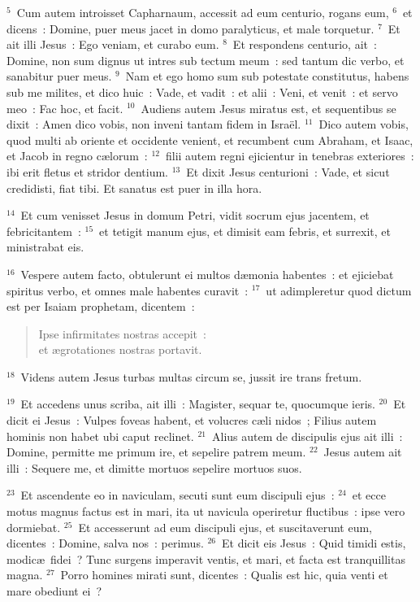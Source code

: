 ${}^{5}$~Cum autem introisset Capharnaum, accessit ad eum centurio, rogans eum,
${}^{6}$~et dicens~: Domine, puer meus jacet in domo paralyticus, et male torquetur.
${}^{7}$~Et ait illi Jesus~: Ego veniam, et curabo eum.
${}^{8}$~Et respondens centurio, ait~: Domine, non sum dignus ut intres sub tectum meum~: sed tantum dic verbo, et sanabitur puer meus.
${}^{9}$~Nam et ego homo sum sub potestate constitutus, habens sub me milites, et dico huic~: Vade, et vadit~: et alii~: Veni, et venit~: et servo meo~: Fac hoc, et facit.
${}^{10}$~Audiens autem Jesus miratus est, et sequentibus se dixit~: Amen dico vobis, non inveni tantam fidem in Isra\"el.
${}^{11}$~Dico autem vobis, quod multi ab oriente et occidente venient, et recumbent cum Abraham, et Isaac, et Jacob in regno c\ae lorum~:
${}^{12}$~filii autem regni ejicientur in tenebras exteriores~: ibi erit fletus et stridor dentium.
${}^{13}$~Et dixit Jesus centurioni~: Vade, et sicut credidisti, fiat tibi. Et sanatus est puer in illa hora.


${}^{14}$~Et cum venisset Jesus in domum Petri, vidit socrum ejus jacentem, et febricitantem~:
${}^{15}$~et tetigit manum ejus, et dimisit eam febris, et surrexit, et ministrabat eis.


${}^{16}$~Vespere autem facto, obtulerunt ei multos d\ae monia habentes~: et ejiciebat spiritus verbo, et omnes male habentes curavit~:
${}^{17}$~ut adimpleretur quod dictum est per Isaiam prophetam, dicentem~: \begin{flushleft}\begin{verse}Ipse infirmitates nostras accepit~:\\ et \ae grotationes nostras portavit.\end{verse}\end{flushleft}


${}^{18}$~Videns autem Jesus turbas multas circum se, jussit ire trans fretum.


${}^{19}$~Et accedens unus scriba, ait illi~: Magister, sequar te, quocumque ieris.
${}^{20}$~Et dicit ei Jesus~: Vulpes foveas habent, et volucres c\ae li nidos~; Filius autem hominis non habet ubi caput reclinet.
${}^{21}$~Alius autem de discipulis ejus ait illi~: Domine, permitte me primum ire, et sepelire patrem meum.
${}^{22}$~Jesus autem ait illi~: Sequere me, et dimitte mortuos sepelire mortuos suos.


${}^{23}$~Et ascendente eo in naviculam, secuti sunt eum discipuli ejus~:
${}^{24}$~et ecce motus magnus factus est in mari, ita ut navicula operiretur fluctibus~: ipse vero dormiebat.
${}^{25}$~Et accesserunt ad eum discipuli ejus, et suscitaverunt eum, dicentes~: Domine, salva nos~: perimus.
${}^{26}$~Et dicit eis Jesus~: Quid timidi estis, modic\ae\ fidei~? Tunc surgens imperavit ventis, et mari, et facta est tranquillitas magna.
${}^{27}$~Porro homines mirati sunt, dicentes~: Qualis est hic, quia venti et mare obediunt ei~?


